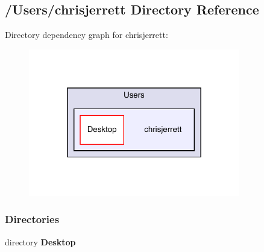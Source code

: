 \subsection{/\+Users/chrisjerrett Directory Reference}
\label{dir_3c3d519b8f3f6a7827cdde10510f8b32}
Directory dependency graph for chrisjerrett\+:
\nopagebreak
\begin{figure}[H]
\begin{center}
\leavevmode
\includegraphics[width=262pt]{dir_3c3d519b8f3f6a7827cdde10510f8b32_dep}
\end{center}
\end{figure}
\subsubsection*{Directories}
\begin{DoxyCompactItemize}
\item 
directory \textbf{ Desktop}
\end{DoxyCompactItemize}
